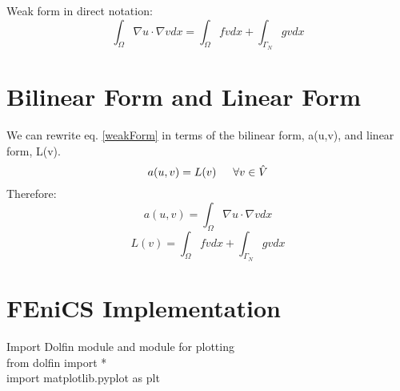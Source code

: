 \documentclass[12pt,3p]{article}
\begin{document}
Weak form in direct notation: 
\begin{equation}\label{weakForm}
\int_{\Omega} \nabla u \cdot \nabla v dx = \int_{\Omega} f v dx + \int_{\Gamma_N} g v dx 
\end{equation}


\section{Bilinear Form and Linear Form}
We can rewrite eq. \ref{weakForm} in terms of the bilinear form, a(u,v), and linear form, L(v). 
\begin{equation}
a(u,v) = L(v)  \indent \forall v \in \hat{V}
\end{equation}
Therefore:
\begin{equation}\label{bilinear}
a(u,v) = \int_{\Omega} \nabla u \cdot \nabla v dx 
\end{equation}
\begin{equation}\label{linear}
L(v) =  \int_{\Omega} f v dx + \int_{\Gamma_N} g v dx 
\end{equation}

\section{FEniCS Implementation}
Import Dolfin module and module for plotting \\
{\selectfont
from dolfin import *  \\
import matplotlib.pyplot as plt
}
\end{document}
